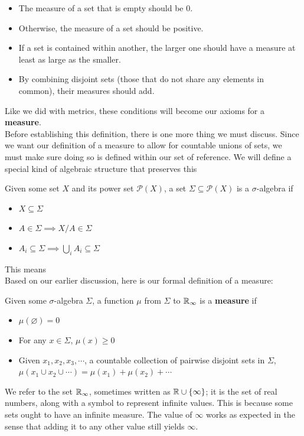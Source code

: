 \begin{itemize}
    \item The measure of a set that is empty should be $0$.
    \item Otherwise, the measure of a set should be positive.
    \item If a set is contained within another, the larger one should have a measure at least as large as the smaller.
    \item By combining disjoint sets (those that do not share any elements in common), their measures should add.
\end{itemize}

Like we did with metrics, these conditions will become our axioms for a \textbf{measure}. \\

Before establishing this definition, there is one more thing we must discuss. Since we want our definition of a measure to allow for countable unions of sets, we must make sure doing so is defined within our set of reference. We will define a special kind of algebraic structure that preserves this

\begin{definition}
    Given some set $X$ and its power set $\mathcal{P}(X)$, a set $\Sigma\subseteq \mathcal{P}(X)$ is a $\sigma$-algebra if
        \begin{itemize}
            \item $X \subseteq \Sigma$
            \item $A\in\Sigma \implies X / A\in\Sigma$
            \item $A_i\subseteq\Sigma \implies \bigcup_i A_i\subseteq \Sigma$
        \end{itemize}
\end{definition} 

This means 
\\

Based on our earlier discussion, here is our formal definition of a measure:\\

\begin{definition}[Measure]
    Given some $\sigma$-algebra $\Sigma$, a function $\mu$ from $\Sigma$ to $\mathbb{R}_\infty$ is a \textbf{measure} if
        \begin{itemize}
            \item $\mu(\varnothing)=0$
            \item For any $x\in\Sigma$, $\mu(x)\geq0$
            \item Given $x_1,x_2,x_3,\cdots$, a countable collection of pairwise disjoint sets in $\Sigma$, $\mu\left(x_1\cup x_2\cup\cdots\right)=\mu(x_1)+\mu(x_2)+\cdots$
        \end{itemize}
\end{definition} 
We refer to the set $\mathbb{R}_\infty$, sometimes written as $\mathbb{R}\cup\{\infty\}$; it is the set of real numbers, along with a symbol to represent infinite values. This is because some sets ought to have an infinite measure. The value of $\infty$ works as expected in the sense that adding it to any other value still yields $\infty$.\\

